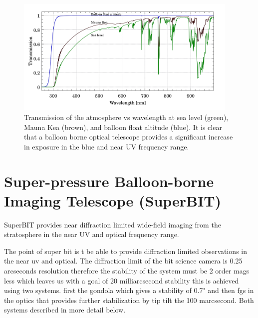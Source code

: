\begin{figure}
    \begin{small}
        \begin{center}
            \includegraphics[width=0.95\textwidth]{Introduction/figs/atmosphere.jpg}
        \end{center}
        \caption{Transmission of the atmosphere vs wavelength at sea level (green), Mauna Kea (brown), and balloon float altitude (blue). It is clear that a balloon borne optical telescope provides a significant increase in exposure in the blue and near UV frequency range.}
        \label{fig:atmos}
    \end{small}
\end{figure}


\section{Super-pressure Balloon-borne Imaging Telescope (SuperBIT)}
SuperBIT provides near diffraction limited wide-field imaging from the stratosphere in the near UV and optical frequency range.  

The point of super bit is t be able to provide diffraction limited observations in the near uv and optical. The diffraction limit of the bit science camera is 0.25 arcseconds resolution therefore the stability of the system must be 2 order mags less which leaves us with a goal of 20 milliarcsecond stability this is achieved using two systems. first the gondola which gives a stability of 0.7" and then fgs in the optics that provides further stabilization by tip tilt the 100 marcsecond. Both systems described in more detail below.

